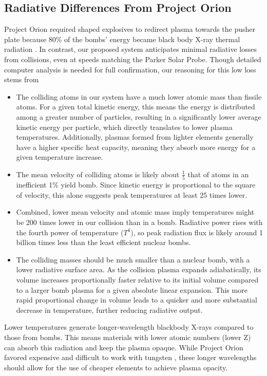 \documentclass{article}
\begin{document}
{\subsection{Radiative Differences From Project Orion}\label{sec:radiative_differences}
Project Orion required shaped explosives to redirect plasma towards the pusher plate because 80\% of the bombs' energy became black body X-ray thermal radiation \cite{toughsf_cassaba_howitzer}.  In contrast, our proposed system anticipates minimal radiative losses from collisions, even at speeds matching the Parker Solar Probe. Though detailed computer analysis is needed for full confirmation, our reasoning for this low loss stems from
\begin{itemize}
    \item The colliding atoms in our system have a much lower atomic mass than fissile atoms. For a given total kinetic energy, this means the energy is distributed among a greater number of particles, resulting in a significantly lower average kinetic energy per particle, which directly translates to lower plasma temperatures. Additionally, plasmas formed from lighter elements generally have a higher specific heat capacity, meaning they absorb more energy for a given temperature increase. 
    \item The mean velocity of colliding atoms is likely about $\frac{1}{5}$ that of atoms in an inefficient 1\% yield bomb.  Since kinetic energy is proportional to the square of velocity, this alone suggests peak temperatures at least 25 times lower.
    \item Combined, lower mean velocity and atomic mass imply temperatures might be 200 times lower in our collision than in a bomb.  Radiative power rises with the fourth power of temperature ($T^4$), so peak radiation flux is likely around 1 billion times less than the least efficient nuclear bombs.
    \item The colliding masses should be much smaller than a nuclear bomb, with a lower radiative surface area.   As the collision plasma expands adiabatically, its volume increases proportionally faster relative to its initial volume compared to a larger bomb plasma for a given absolute linear expansion. This more rapid proportional change in volume leads to a quicker and more substantial decrease in temperature, further reducing radiative output.
\end{itemize}

Lower temperatures generate longer-wavelength blackbody X-rays compared to those from bombs. This means materials with lower atomic numbers (lower Z) can absorb this radiation and keep the plasma opaque. While Project Orion favored expensive and difficult to work with tungsten \cite{toughsf_cassaba_howitzer}, these longer wavelengths should allow for the use of cheaper elements to achieve plasma opacity.

}
\end{document}
